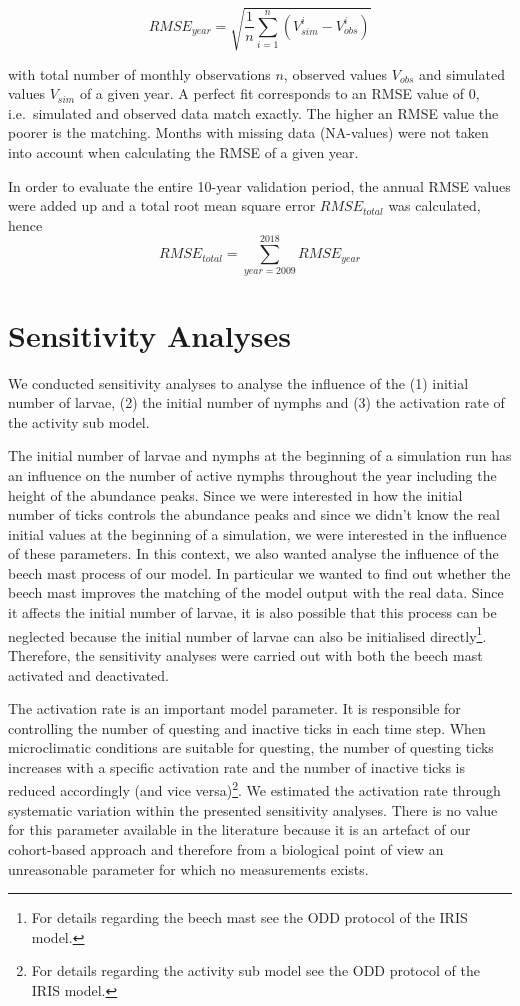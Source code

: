 \documentclass[a4paper, 11pt]{scrartcl}
\begin{document}
\begin{equation}\label{eq:rmse}
RMSE_{year} = \sqrt{ \frac{1}{n} \sum_{i=1}^n (V_{sim}^i - V_{obs}^i)}
\end{equation}

with total number of monthly observations $n$, observed values $V_{obs}$ and simulated values $V_{sim}$ of a given year. A perfect fit corresponds to an RMSE value of 0, i.e.\
simulated and observed data match exactly. The higher an RMSE value the poorer is the matching. Months with missing data (NA-values) were not taken into account when
calculating the RMSE of a given year.

In order to evaluate the entire 10-year validation period, the annual RMSE values were added up and a total root mean square error $RMSE_{total}$ was calculated, hence
\begin{equation}\label{eq:total_rmse}
RMSE_{total} = \sum_{year=2009}^{2018} RMSE_{year}
\end{equation}


\section{Sensitivity Analyses}
We conducted sensitivity analyses to analyse the influence of the (1) initial number of larvae, (2) the initial number of nymphs and (3) the activation rate of the activity sub
model.

The initial number of larvae and nymphs at the beginning of a simulation run has an influence on the number of active nymphs throughout the year including the height of the
abundance peaks. Since we were interested in how the initial number of ticks controls the abundance peaks and since we didn't know the real initial values at the beginning of a
simulation, we were interested in the influence of these parameters. In this context, we also wanted analyse the influence of the beech mast process of our model. In
particular we wanted to find out whether the beech mast improves the matching of the model output with the real data. Since it affects the initial number of larvae, it
is also possible that this process can be neglected because the initial number of larvae can also be initialised directly\footnote{For details regarding the beech mast
see the ODD protocol of the IRIS model.}. Therefore, the sensitivity analyses were carried out with both the beech mast activated and deactivated.

The activation rate is an important model parameter. It is responsible for controlling the number of questing and inactive ticks in each time step. When microclimatic
conditions are suitable for questing, the number of questing ticks increases with a specific activation rate and the number of inactive ticks is reduced accordingly (and vice
versa)\footnote{For details regarding the activity sub model see the ODD protocol of the IRIS model.}. We estimated the activation rate through systematic variation within the
presented sensitivity analyses. There is no value for this parameter available in the literature because it is an artefact of our cohort-based approach and
therefore from a biological point of view an unreasonable parameter for which no measurements exists.
\end{document}
